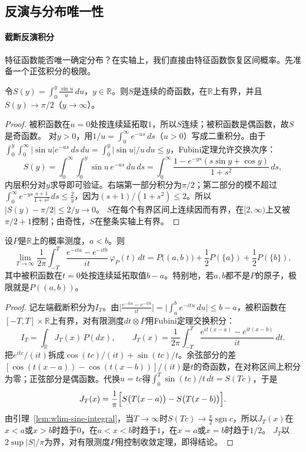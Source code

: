\subsection{反演与分布唯一性}

\paragraph{截断反演积分}
特征函数能否唯一确定分布？在实轴上，我们直接由特征函数恢复区间概率。先准备一个正弦积分的极限。

\begin{lemma}[正弦积分]
\label{lem:wlim-sine-integral}
令$S(y)=\int_0^y\frac{\sin u}u\,du$，$y\in\mathbb R$。则$S$是连续的奇函数，在$\mathbb R$上有界，并且$S(y)\to\pi/2$（$y\to\infty$）。
\end{lemma}

\begin{proof}
被积函数在$u=0$处按连续延拓取$1$，所以$S$连续；被积函数是偶函数，故$S$是奇函数。
对$y>0$，用$1/u=\int_0^\infty e^{-us}\,ds$（$u>0$）写成二重积分。由于$\int_0^y\int_0^\infty|\sin u|e^{-us}\,ds\,du=\int_0^y|\sin u|/u\,du\leq y$，Fubini定理允许交换次序：
\[
  S(y)=\int_0^\infty\!\!\int_0^y\sin u\,e^{-us}\,du\,ds=\int_0^\infty\frac{1-e^{-ys}(s\sin y+\cos y)}{1+s^2}\,ds,
\]
内层积分对$y$求导即可验证。右端第一部分积分为$\pi/2$；第二部分的模不超过$\int_0^\infty e^{-ys}\frac{s+1}{1+s^2}\,ds\leq\frac2y$，因为$(s+1)/(1+s^2)\leq2$。所以$|S(y)-\pi/2|\leq2/y\to0$。
$S$在每个有界区间上连续因而有界，在$[2,\infty)$上又被$\pi/2+1$控制；由奇性，$S$在整条实轴上有界。
\end{proof}

\begin{theorem}[反演公式]
\label{thm:wlim-inversion}
设$P$是$\mathbb R$上的概率测度，$a<b$。则
\[
  \lim_{T\to\infty}\frac1{2\pi}\int_{-T}^T\frac{e^{-ita}-e^{-itb}}{it}\,\varphi_P(t)\,dt=P\bigl((a,b)\bigr)+\frac12P(\{a\})+\frac12P(\{b\}),
\]
其中被积函数在$t=0$处按连续延拓取值$b-a$。特别地，若$a,b$都不是$P$的原子，极限就是$P((a,b))$。
\end{theorem}

\begin{proof}
记左端截断积分为$I_T$。由$\bigl|\frac{e^{-ita}-e^{-itb}}{it}\bigr|=\bigl|\int_a^be^{-itu}\,du\bigr|\leq b-a$，被积函数在$[-T,T]\times\mathbb R$上有界，对有限测度$dt\otimes P$用Fubini定理交换积分：
\[
  I_T=\int_{\mathbb R}J_T(x)\,P(dx),\qquad J_T(x)=\frac1{2\pi}\int_{-T}^T\frac{e^{it(x-a)}-e^{it(x-b)}}{it}\,dt.
\]
把$e^{itc}/(it)$拆成$\cos(tc)/(it)+\sin(tc)/t$。余弦部分的差$[\cos(t(x-a))-\cos(t(x-b))]/(it)$是$t$的奇函数，在对称区间上积分为零；正弦部分是偶函数。代换$u=tc$得$\int_0^T\sin(tc)/t\,dt=S(Tc)$，于是
\[
  J_T(x)=\frac1\pi\Bigl[S\bigl(T(x-a)\bigr)-S\bigl(T(x-b)\bigr)\Bigr].
\]
由引理~\ref{lem:wlim-sine-integral}，当$T\to\infty$时$S(Tc)\to\frac\pi2\operatorname{sgn}c$，所以$J_T(x)$在$x<a$或$x>b$时趋于$0$，在$a<x<b$时趋于$1$，在$x=a$或$x=b$时趋于$1/2$。
$J_T$以$2\sup|S|/\pi$为界，对有限测度$P$用控制收敛定理，即得结论。
\end{proof}

